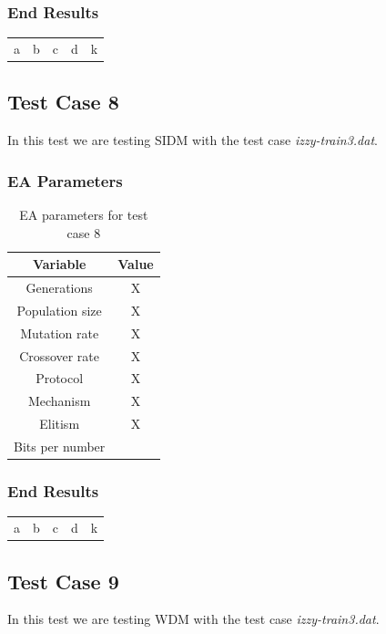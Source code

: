 \subsubsection{End Results}\label{sec:test-case-7-results}
\begin{table}
	\begin{tabular}{c c c c c}
		a & b & c & d & k \\
	\end{tabular}
\end{table}

\subsection{Test Case 8}\label{sec:test-case-8}
In this test we are testing SIDM with the test case
\textit{izzy-train3.dat}.
\subsubsection{EA Parameters}\label{sec:test-case-8-parameters}
\begin{table}
	\begin{tabular}{c c}
		Variable & Value \\
		\hline
		Generations & X \\
		\hline
		Population size & X \\
		\hline
		Mutation rate & X \\
		\hline
		Crossover rate & X \\
		\hline
		Protocol & X \\
		\hline
		Mechanism & X \\
		\hline
		Elitism & X \\
		\hline
		Bits per number & \\
	\end{tabular}
	\caption{EA parameters for test case 8}
\end{table}
\subsubsection{End Results}\label{sec:test-case-8-results}
\begin{table}
	\begin{tabular}{c c c c c}
		a & b & c & d & k \\
	\end{tabular}
\end{table}

\subsection{Test Case 9}\label{sec:test-case-9}
In this test we are testing WDM with the test case
\textit{izzy-train3.dat}.
